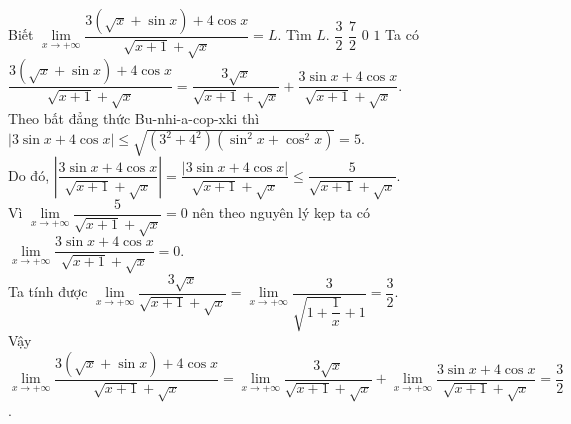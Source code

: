 \begin{ex}%
 Biết $\lim\limits_{x\to +\infty}\dfrac{3\left(\sqrt{x}+\sin x\right)+4\cos x}{\sqrt{x+1}+\sqrt{x}}=L$. Tìm $L$.	
 \choice
  {\True $\dfrac{3}{2}$}
  {$\dfrac{7}{2}$}
  {$0$}
  {$1$}
 \loigiai
  {
  Ta có $\dfrac{3\left(\sqrt{x}+\sin x\right)+4\cos x}{\sqrt{x+1}+\sqrt{x}}=\dfrac{3\sqrt{x}}{\sqrt{x+1}+\sqrt{x}}+\dfrac{3\sin x+4\cos x}{\sqrt{x+1}+\sqrt{x}}$.\\
  Theo bất đẳng thức Bu-nhi-a-cop-xki thì $|3\sin x+4\cos x|\leq \sqrt{(3^2+4^2)(\sin^2 x+\cos^2x)}=5$.\\
  Do đó, $\left|\dfrac{3\sin x+4\cos x}{\sqrt{x+1}+\sqrt{x}}\right|=\dfrac{|3\sin x+4\cos x|}{\sqrt{x+1}+\sqrt{x}}\leq \dfrac{5}{\sqrt{x+1}+\sqrt{x}}$.\\
  Vì $ \lim\limits_{x\to +\infty} \dfrac{5}{\sqrt{x+1}+\sqrt{x}}=0$ nên theo nguyên lý kẹp ta có $ \lim\limits_{x\to +\infty} \dfrac{3\sin x+4\cos x}{\sqrt{x+1}+\sqrt{x}}=0$.\\
  Ta tính được $\lim\limits_{x\to +\infty} \dfrac{3\sqrt{x}}{\sqrt{x+1}+\sqrt{x}}=\lim\limits_{x\to +\infty}\dfrac{3}{\sqrt{1+\dfrac{1}{x}}+1}=\dfrac{3}{2}$.\\
  Vậy $\lim\limits_{x\to +\infty}\dfrac{3(\sqrt{x}+\sin x)+4\cos x}{\sqrt{x+1}+\sqrt{x}}= \lim\limits_{x\to +\infty} \dfrac{3\sqrt{x}}{\sqrt{x+1}+\sqrt{x}}+\lim\limits_{x\to +\infty} \dfrac{3\sin x+4\cos x}{\sqrt{x+1}+\sqrt{x}}=\dfrac{3}{2}$.		
	}
\end{ex}


